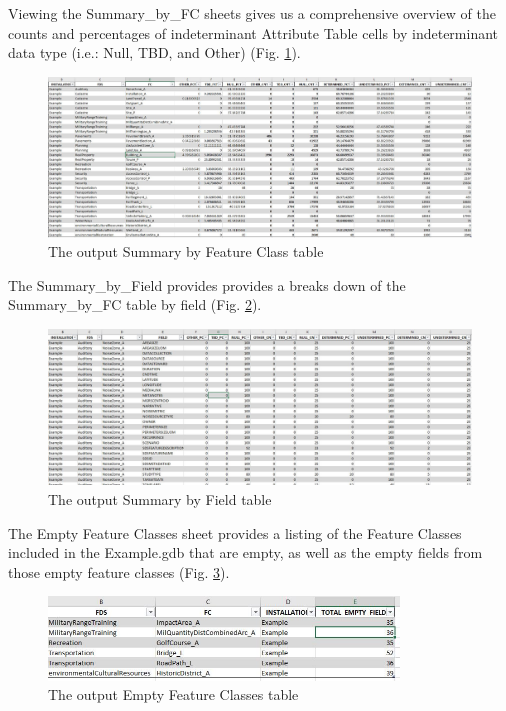 \documentclass[openany]{book}
\theoremstyle{definition}
\theoremstyle{definition}
\theoremstyle{definition}
\theoremstyle{remark}
\begin{document}
Viewing the Summary\_by\_FC sheets gives us a comprehensive overview of
the counts and percentages of indeterminant Attribute Table cells by
indeterminant data type (i.e.: Null, TBD, and Other) (Fig.
\ref{fig:summIndtsheet1}).

\begin{figure}[H]

{\centering \includegraphics[width=0.8\linewidth,]{figures/summIndt-sheet1} 

}

\caption{The output Summary by Feature Class table}\label{fig:summIndtsheet1}
\end{figure}

The Summary\_by\_Field provides provides a breaks down of the
Summary\_by\_FC table by field (Fig. \ref{fig:summIndtsheet2}).

\begin{figure}[H]

{\centering \includegraphics[width=0.8\linewidth,]{figures/summIndt-sheet2} 

}

\caption{The output Summary by Field table}\label{fig:summIndtsheet2}
\end{figure}

The Empty Feature Classes sheet provides a listing of the Feature
Classes included in the Example.gdb that are empty, as well as the empty
fields from those empty feature classes (Fig. \ref{fig:summIndtsheet3}).

\begin{figure}[H]

{\centering \includegraphics[width=3.67in,]{figures/summIndt-sheet3} 

}

\caption{The output Empty Feature Classes table}\label{fig:summIndtsheet3}
\end{figure}
\end{document}

